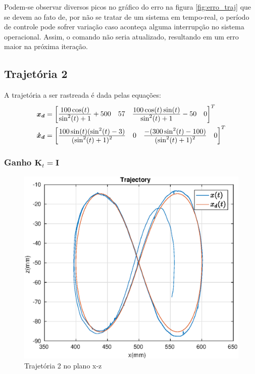 Podem-se observar diversos picos no gráfico do erro na figura \ref{fig:erro_traj} que se devem ao fato de, por não se tratar de um sistema em tempo-real, o período de controle pode sofrer variação caso aconteça alguma interrupção no sistema operacional. Assim, o comando não seria atualizado, resultando em um erro maior na próxima iteração.


\subsection{Trajetória 2}
A trajetória a ser rastreada é dada pelas equações:
\begin{align}
\bm{x_d} &= \begin{bmatrix} 
\frac{\displaystyle 100 \cos(t)}{\displaystyle \sin^2(t) + 1} + 500 &
57 &
\frac{\displaystyle 100\cos(t) \sin(t)}{\displaystyle \sin^2(t) + 1} -50 & 
0
\end{bmatrix}^T \\
\bm{\dot{x}_d} &= \begin{bmatrix}
\frac{\displaystyle 100\sin(t) (\sin^2(t) -3 )}{\displaystyle (\sin^2(t) + 1)^2} &
0 &
\frac{\displaystyle -(300 \sin^2(t) - 100)}{\displaystyle (\sin^2(t) + 1)^2} &
0\end{bmatrix}^T
\end{align}

\subsubsection{Ganho $\bm{K}_t = \bm{I}$}
\begin{figure}[H]
\centering
  \includegraphics[width=0.5\linewidth]{./img/traj_2_k1/traj.eps}
  \caption{Trajetória 2 no plano x-z}
  \label{fig:sub1}
\end{figure}%


